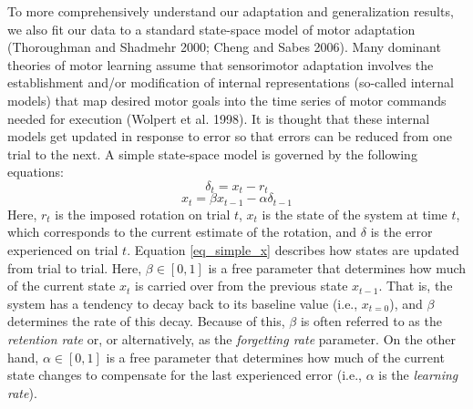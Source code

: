 \documentclass[jou, apacite, 11pt, longtable, floatsintext, notab]{apa6}
\begin{document}
To more comprehensively understand our adaptation and
generalization results, we also fit our data to a standard
state-space model of motor adaptation (Thoroughman and
Shadmehr 2000; Cheng and Sabes 2006). Many dominant theories
of motor learning assume that sensorimotor adaptation
involves the establishment and/or modification of internal
representations (so-called internal models) that map desired
motor goals into the time series of motor commands needed
for execution (Wolpert et al. 1998). It is thought that
these internal models get updated in response to error so
that errors can be reduced from one trial to the next. A
simple state-space model is governed by the following
equations:
\begin{equation}
  \delta_{t} = x_{t} - r_{t}
  \label{eq_simple_err}
\end{equation}
\begin{equation}
  x_{t} = \beta x_{t-1} - \alpha \delta_{t-1}
  \label{eq_simple_x}
\end{equation}
Here, $r_t$ is the imposed rotation on trial $t$, $x_t$ is
the state of the system at time $t$, which corresponds to
the current estimate of the rotation, and $\delta$ is the
error experienced on trial $t$. Equation \ref{eq_simple_x}
describes how states are updated from trial to trial. Here,
$\beta \in [0,1]$ is a free parameter that
determines how much of the current state $x_t$ is carried
over from the previous state $x_{t-1}$. That is, the system
has a tendency to decay back to its baseline value (i.e.,
$x_{t=0}$), and $\beta$ determines the rate of this decay.
Because of this, $\beta$ is often referred to as the
\emph{retention rate} or, or alternatively, as the
\emph{forgetting rate} parameter. On the other hand, $\alpha
\in [0,1]$ is a free parameter that determines how much of
the current state changes to compensate for the last
experienced error (i.e., $\alpha$ is the \emph{learning
rate}).

\end{document}
